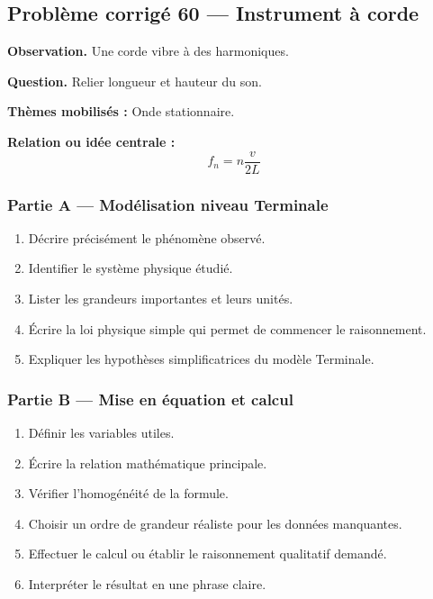 \documentclass[11pt,a4paper]{article}
\begin{document}
\subsection{Problème corrigé 60 — Instrument à corde}

\begin{exercicebox}
\textbf{Observation.} Une corde vibre à des harmoniques.

\medskip
\textbf{Question.} Relier longueur et hauteur du son.

\medskip
\textbf{Thèmes mobilisés :} Onde stationnaire.

\medskip
\textbf{Relation ou idée centrale :}
\[
f_n=n\frac{v}{2L}
\]
\end{exercicebox}

\subsubsection*{Partie A — Modélisation niveau Terminale}

\begin{enumerate}
  \item Décrire précisément le phénomène observé.
  \item Identifier le système physique étudié.
  \item Lister les grandeurs importantes et leurs unités.
  \item Écrire la loi physique simple qui permet de commencer le raisonnement.
  \item Expliquer les hypothèses simplificatrices du modèle Terminale.
\end{enumerate}

\subsubsection*{Partie B — Mise en équation et calcul}

\begin{enumerate}
  \item Définir les variables utiles.
  \item Écrire la relation mathématique principale.
  \item Vérifier l'homogénéité de la formule.
  \item Choisir un ordre de grandeur réaliste pour les données manquantes.
  \item Effectuer le calcul ou établir le raisonnement qualitatif demandé.
  \item Interpréter le résultat en une phrase claire.
\end{enumerate}
\end{document}
